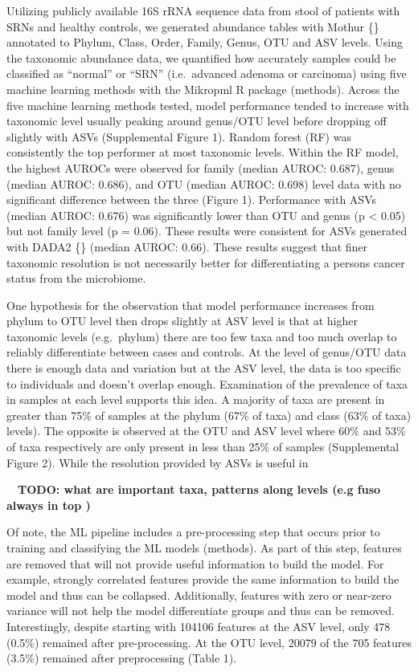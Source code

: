 \documentclass[
]{article}
\begin{document}
Utilizing publicly available 16S rRNA sequence data from stool of
patients with SRNs and healthy controls, we generated abundance tables
with Mothur \{\} annotated to Phylum, Class, Order, Family, Genus, OTU
and ASV levels. Using the taxonomic abundance data, we quantified how
accurately samples could be classified as ``normal'' or ``SRN''
(i.e.~advanced adenoma or carcinoma) using five machine learning methods
with the Mikropml R package (methods). Across the five machine learning
methods tested, model performance tended to increase with taxonomic
level usually peaking around genus/OTU level before dropping off
slightly with ASVs (Supplemental Figure 1). Random forest (RF) was
consistently the top performer at most taxonomic levels. Within the RF
model, the highest AUROCs were observed for family (median AUROC:
0.687), genus (median AUROC: 0.686), and OTU (median AUROC: 0.698) level
data with no significant difference between the three (Figure 1).
Performance with ASVs (median AUROC: 0.676) was significantly lower than
OTU and genus (p \textless{} 0.05) but not family level (p = 0.06).
These results were consistent for ASVs generated with DADA2 \{\} (median
AUROC: 0.66). These results suggest that finer taxonomic resolution is
not necessarily better for differentiating a persons cancer status from
the microbiome.

One hypothesis for the observation that model performance increases from
phylum to OTU level then drops slightly at ASV level is that at higher
taxonomic levels (e.g.~phylum) there are too few taxa and too much
overlap to reliably differentiate between cases and controls. At the
level of genus/OTU data there is enough data and variation but at the
ASV level, the data is too specific to individuals and doesn't overlap
enough. Examination of the prevalence of taxa in samples at each level
supports this idea. A majority of taxa are present in greater than 75\%
of samples at the phylum (67\% of taxa) and class (63\% of taxa)
levels). The opposite is observed at the OTU and ASV level where 60\%
and 53\% of taxa respectively are only present in less than 25\% of
samples (Supplemental Figure 2). While the resolution provided by ASVs
is useful in

~~\textbf{TODO: what are important taxa, patterns along levels (e.g fuso
always in top )}

Of note, the ML pipeline includes a pre-processing step that occurs
prior to training and classifying the ML models (methods). As part of
this step, features are removed that will not provide useful information
to build the model. For example, strongly correlated features provide
the same information to build the model and thus can be collapsed.
Additionally, features with zero or near-zero variance will not help the
model differentiate groups and thus can be removed. Interestingly,
despite starting with 104106 features at the ASV level, only 478 (0.5\%)
remained after pre-processing. At the OTU level, 20079 of the 705
features (3.5\%) remained after preprocessing (Table 1).
\end{document}
